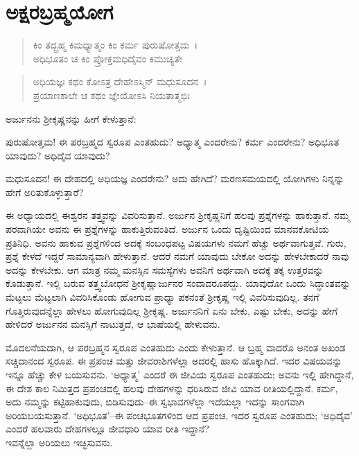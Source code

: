 
\chapter{ಅಕ್ಷರಬ್ರಹ್ಮಯೋಗ}

\begin{verse}
ಕಿಂ ತದ್ಬ್ರಹ್ಮ ಕಿಮಧ್ಯಾತ್ಮಂ ಕಿಂ ಕರ್ಮ ಪುರುಷೋತ್ತಮ~।\\ಅಧಿಭೂತಂ ಚ ಕಿಂ ಪ್ರೋಕ್ತಮಧಿದೈವಂ ಕಿಮುಚ್ಯತೇ 
\end{verse}

\begin{verse}
ಅಧಿಯಜ್ಞಃ ಕಥಂ ಕೋಽತ್ರ ದೇಹೇಽಸ್ಮಿನ್ ಮಧುಸೂದನ~।\\ಪ್ರಯಾಣಕಾಲೇ ಚ ಕಥಂ ಜ್ಞೇಯೋಽಸಿ ನಿಯತಾತ್ಮಭಿಃ 
\end{verse}

ಅರ್ಜುನನು ಶ‍್ರೀಕೃಷ್ಣನನ್ನು ಹೀಗೆ ಕೇಳುತ್ತಾನೆ:

{\small ಪುರುಷೋತ್ತಮ! ಈ ಪರಬ್ರಹ್ಮದ ಸ್ವರೂಪ ಎಂತಹುದು? ಅಧ್ಯಾತ್ಮ ಎಂದರೇನು? ಕರ್ಮ ಎಂದರೇನು? ಅಧಿಭೂತ ಯಾವುದು? ಅಧಿದೈವ ಯಾವುದು?}

{\small ಮಧುಸೂದನ! ಈ ದೇಹದಲ್ಲಿ ಅಧಿಯಜ್ಞ ಎಂದರೇನು? ಅದು ಹೇಗಿದೆ? ಮರಣಸಮಯದಲ್ಲಿ ಯೋಗಿಗಳು ನಿನ್ನನ್ನು ಹೇಗೆ ಅರಿತುಕೊಳ್ಳುತ್ತಾರೆ?}

ಈ ಅಧ್ಯಾಯದಲ್ಲಿ ಈಶ್ವರನ ತತ್ತ್ವವನ್ನು ವಿವರಿಸುತ್ತಾನೆ. ಅರ್ಜುನ ಶ‍್ರೀಕೃಷ್ಣನಿಗೆ ಹಲವು ಪ್ರಶ್ನೆಗಳನ್ನು ಹಾಕುತ್ತಾನೆ. ನಮ್ಮ ಪರವಾಗಿಯೇ ಅವನು ಈ ಪ್ರಶ್ನೆಗಳನ್ನು ಹಾಕುತ್ತಿರುವಂತಿದೆ. ಅರ್ಜುನ ಒಂದು ದೃಷ್ಟಿಯಿಂದ ಮಾನವಕೋಟಿಯ ಪ್ರತಿನಿಧಿ. ಅವನು ಹಾಕುವ ಪ್ರಶ್ನೆಗಳಿಂದ ಅದಕ್ಕೆ ಸಂಬಂಧಪಟ್ಟ ವಿಷಯಗಳು ನಮಗೆ ಹೆಚ್ಚು ಅರ್ಥವಾಗುತ್ತವೆ. ಗುರು, ಪ್ರಶ್ನೆ ಕೇಳದೆ ಇದ್ದರೆ ಸಾಮಾನ್ಯವಾಗಿ ಹೇಳುತ್ತಾನೆ. ಆದರೆ ನಮಗೆ ಯಾವುದು ಬೇಕೋ ಅದನ್ನು ಹೇಳಬೇಕಾದರೆ ನಾವು ಅದನ್ನು ಕೇಳಬೇಕು. ಆಗ ಮಾತ್ರ ನಮ್ಮ ಮನಸ್ಸಿನ ಸಮಸ್ಯೆಗಳು ಅವನಿಗೆ ಅರ್ಥವಾಗಿ ಅದಕ್ಕೆ ತಕ್ಕ ಉತ್ತರವನ್ನು ಕೊಡುತ್ತಾನೆ. ಇಲ್ಲಿ ಬರುವ ತತ್ತ್ವಬೋಧನೆ ಶ‍್ರೀಕೃಷ್ಣಾರ್ಜುನರ ಸಂವಾದರೂಪದ್ದು. ಯಾವುದೋ ಒಂದು ಸಿದ್ಧಾಂತವನ್ನು ಮೆಟ್ಟಲು ಮೆಟ್ಟಲಾಗಿ ವಿವರಿಸಿಕೊಂಡು ಹೋಗುವ ಪ್ರಾಧ್ಯಾ ಪಕನಂತೆ ಶ‍್ರೀಕೃಷ್ಣ ಇಲ್ಲಿ ವಿವರಿಸುವುದಿಲ್ಲ. ತನಗೆ ಗೊತ್ತಿರುವುದನ್ನೆಲ್ಲಾ ಹೇಳಲು ಹೋಗುವುದಿಲ್ಲ ಶ‍್ರೀಕೃಷ್ಣ. ಅರ್ಜುನನಿಗೆ ಏನು ಬೇಕು, ಎಷ್ಟು ಬೇಕು, ಅದನ್ನು ಹೇಗೆ ಹೇಳಿದರೆ ಅರ್ಜುನನ ಮನಸ್ಸಿಗೆ ನಾಟುತ್ತದೆ, ಆ ಭಾಷೆಯಲ್ಲಿ ಹೇಳುವನು.

ಮೊದಲನೆಯದಾಗಿ, ಆ ಪರಬ್ರಹ್ಮನ ಸ್ವರೂಪ ಎಂತಹುದು ಎಂದು ಕೇಳುತ್ತಾನೆ. ಆ ಬ್ರಹ್ಮ ವಾದರೊ ಅನಂತ ಅಖಂಡ ಸಚ್ಚಿದಾನಂದ ಸ್ವರೂಪ. ಈ ಪ್ರಪಂಚ ಮತ್ತು ಜೀವರಾಶಿಗಳೆಲ್ಲಾ ಅದರಲ್ಲಿ ಹಾಸು ಹೊಕ್ಕಾಗಿದೆ. ಇದರ ವಿಷಯವನ್ನು ಇನ್ನೂ ಹೆಚ್ಚು ಕೇಳ ಬಯಸುವನು. ‘ಅಧ್ಯಾತ್ಮ’ ಎಂದರೆ ಈ ಜೀವಿಯ ಸ್ವರೂಪ ಎಂತಹುದು; ಅವನು ಇಲ್ಲಿ ಹೇಗಿದ್ದಾನೆ, ಈ ದೇಶ ಕಾಲ ನಿಮಿತ್ತದ ಪ್ರಪಂಚದಲ್ಲಿ ಹಲವು ದೇಹಗಳನ್ನು ಧರಿಸಿರುವ ಜೀವಿ ಯಾವ ರೀತಿಯಲ್ಲಿದ್ದಾನೆ. ಕರ್ಮ, ಅದು ನಮ್ಮನ್ನು ಕಟ್ಟಿಹಾಕುವುದು, ಬಿಡಿಸುವುದು–ಈ ಸ್ವಭಾವಗಳೆಲ್ಲಾ ಇದೆಯಲ್ಲಾ ಇದನ್ನು ಸಾಂಗವಾಗಿ ಅರಿಯಬಯಸುತ್ತಾನೆ. ‘ಅಧಿಭೂತ’–ಈ ಪಂಚಭೂತಗಳಿಂದ ಆದ ಪ್ರಪಂಚ, ಇದರ ಸ್ವರೂಪ ಎಂತಹುದು; ‘ಅಧಿದೈವ’ ಎಂದರೆ ಹಲವಾರು ದೇಹಗಳಲ್ಲೂ ಜೀವಧಾರಿ ಯಾವ ರೀತಿ ಇದ್ದಾನೆ?\\ಇವನ್ನೆಲ್ಲಾ ಅರಿಯಲು ಇಚ್ಛಿಸುವನು.

